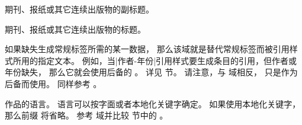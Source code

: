 \begin{fieldlist}



期刊、报纸或其它连续出版物的副标题。




期刊、报纸或其它连续出版物的标题。




如果缺失生成常规标签所需的某一数据，
那么该域就是替代常规标签而被引用样式所用的指定文本。
例如，当|作者-年份|引用样式要生成条目的引用，但作者或年份缺失，
那么它就会使用后备的 。
详见  节。
请注意，与  域相反， 只是作为后备而使用。
同样参考 。




作品的语言。
语言可以按字面或者本地化关键字确定。
如果使用本地化关键字，那么前缀  将省略。
参考  域并比较  节中的 。




\end{fieldlist}
